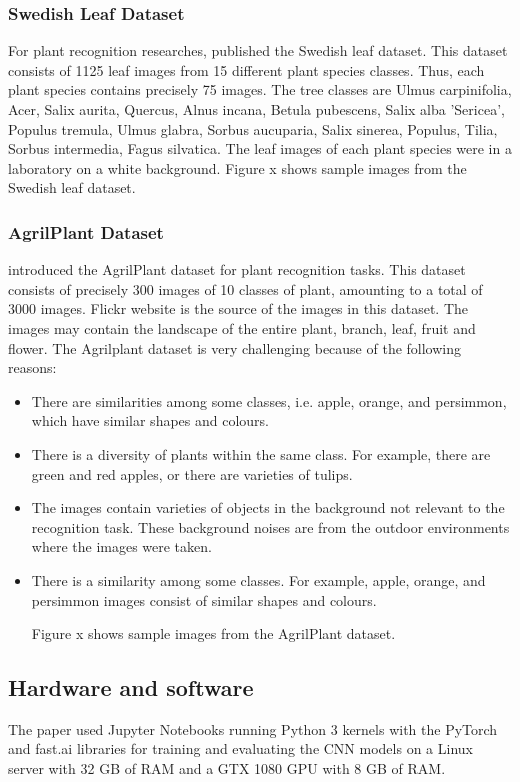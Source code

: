 \documentclass[conference]{IEEEtran}
\begin{document}
\subsubsection{Swedish Leaf Dataset}
For plant recognition researches, \cite{soderkvist2001computer} published the Swedish leaf dataset. This dataset consists of 1125 leaf images from 15 different plant species classes. Thus, each plant species contains precisely 75 images. The tree classes are Ulmus carpinifolia, Acer, Salix aurita, Quercus, Alnus incana, Betula pubescens, Salix alba 'Sericea', Populus tremula, Ulmus glabra, Sorbus aucuparia, Salix sinerea, Populus, Tilia, Sorbus intermedia, Fagus silvatica. The leaf images of each plant species were in a laboratory on a white background. Figure x shows sample images from the Swedish leaf dataset.


\subsubsection{AgrilPlant Dataset}
 \cite{pawara2017comparing} introduced the AgrilPlant dataset for plant recognition tasks. This dataset consists of precisely 300 images of 10 classes of plant, amounting to a total of 3000 images. Flickr website is the source of the images in this dataset. The images may contain the landscape of the entire plant, branch, leaf, fruit and flower. The Agrilplant dataset is very challenging because of the following reasons:
 
 \begin{itemize}
     \item There are similarities among some classes, i.e. apple, orange, and persimmon, which have similar shapes and colours.
     \item There is a diversity of plants within the same class. For example, there are green and red apples, or there are varieties of tulips.
     \item The images contain varieties of objects in the background not relevant to the recognition task. These background noises are from the outdoor environments where the images were taken.
     \item There is a similarity among some classes. For example, apple, orange, and persimmon images consist of similar shapes and colours.

Figure x shows sample images from the AgrilPlant dataset.

 \end{itemize}

\subsection{Hardware and software}
The paper used Jupyter Notebooks \cite{kluyver2016jupyter} running Python 3 kernels with the PyTorch \cite{paszke2017automatic} and fast.ai \cite{howard2018fastai} libraries for training and evaluating the CNN models on a Linux server with 32 GB of RAM and a GTX 1080 GPU with 8 GB of RAM.
\end{document}
